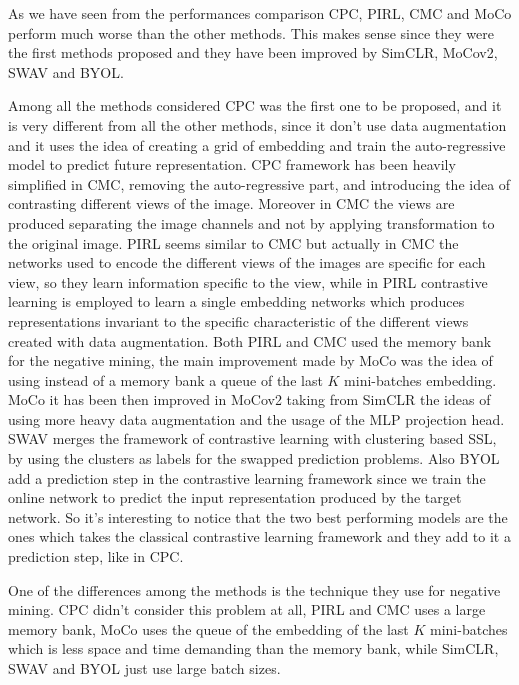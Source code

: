 As we have seen from the performances comparison CPC, PIRL, CMC and MoCo perform much worse than the other methods. This makes sense since they were the first methods proposed and they have been improved by SimCLR, MoCov2, SWAV and BYOL. 

Among all the methods considered CPC was the first one to be proposed, and it is very different from all the other methods, since it don't use data augmentation and it uses the idea of creating a grid of embedding and train the auto-regressive model to predict future representation. CPC framework has been heavily simplified in CMC, removing the auto-regressive part, and introducing the idea of contrasting different views of the image. Moreover in CMC the views are produced separating the image channels and not by applying transformation to the original image. PIRL seems similar to CMC but actually in CMC the networks used to encode the different views of the images are specific for each view, so they learn information specific to the view, while in PIRL contrastive learning is employed to learn a single embedding networks which produces representations invariant to the specific characteristic of the different views created with data augmentation. Both PIRL and CMC used the memory bank for the negative mining, the main improvement made by MoCo was the idea of using instead of a memory bank a queue of the last $K$ mini-batches embedding. MoCo it has been then improved in MoCov2 taking from SimCLR the ideas of using more heavy data augmentation and the usage of the MLP projection head. SWAV merges the framework of contrastive learning with clustering based SSL, by using the clusters as labels for the swapped prediction problems. Also BYOL add a prediction step in the contrastive learning framework since we train the online network to predict the input representation produced by the target network. So it's interesting to notice that the two best performing models are the ones which takes the classical contrastive learning framework and they add to it a prediction step, like in CPC. 

One of the differences among the methods is the technique they use for negative mining. CPC didn't consider this problem at all, PIRL and CMC uses a large memory bank, MoCo uses the queue of the embedding of the last $K$ mini-batches which is less space and time demanding than the memory bank, while SimCLR, SWAV and BYOL just use large batch sizes.